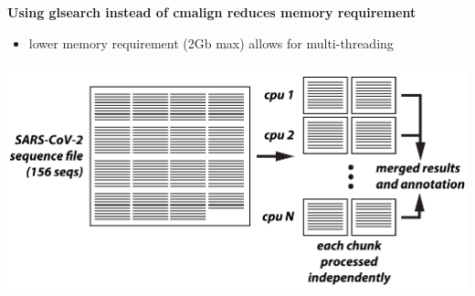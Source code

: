 \documentclass[landscape]{slides}
\begin{document}
\begin{slide}
\begin{center}
\textbf{Using glsearch instead of cmalign reduces memory requirement}
\end{center}

\begin{itemize}
\item lower memory requirement (2Gb max) allows for multi-threading
\end{itemize}

\begin{center}
\includegraphics[width=10.5in]{figs/vadr-1p2-multithreading}
\end{center}
  
\vfill
\end{slide}
\end{document}
